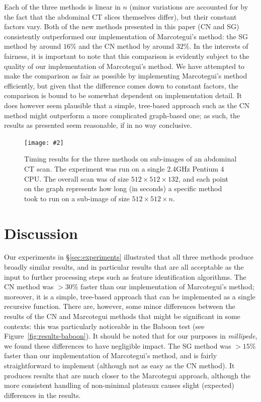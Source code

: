 \documentclass[preprint,a4paper]{elsarticle}
\newcommand{\stufigex}[5]					%
{
	\begin{figure}[#5]
	\begin{center}
		\texttt{[image: \#2]}
		\caption{#3}
		\label{#4}
	\end{center}
	\end{figure}
}
\begin{document}
Each of the three methods is linear in $n$ (minor variations are accounted for by the fact that the abdominal CT slices themselves differ), but their constant factors vary. Both of the new methods presented in this paper (CN and SG) consistently outperformed our implementation of Marcotegui's method: the SG method by around $16$\% and the CN method by around $32$\%. In the interests of fairness, it is important to note that this comparison is evidently subject to the quality of our implementation of Marcotegui's method. We have attempted to make the comparison as fair as possible by implementing Marcotegui's method efficiently, but given that the difference comes down to constant factors, the comparison is bound to be somewhat dependent on implementation detail. It does however seem plausible that a simple, tree-based approach such as the CN method might outperform a more complicated graph-based one; as such, the results as presented seem reasonable, if in no way conclusive.

\stufigex{width=.95\linewidth}{timings.png}{Timing results for the three methods on sub-images of an abdominal CT scan. The experiment was run on a single 2.4GHz Pentium 4 CPU. The overall scan was of size $512 \times 512 \times 132$, and each point on the graph represents how long (in seconds) a specific method took to run on a sub-image of size $512 \times 512 \times n$.}{fig:timings}{!t}


\section{Discussion}
\label{sec:discussion}

Our experiments in \S\ref{sec:experiments} illustrated that all three methods produce broadly similar results, and in particular results that are all acceptable as the input to further processing steps such as feature identification algorithms. The CN method was $> 30$\% faster than our implementation of Marcotegui's method; moreover, it is a simple, tree-based approach that can be implemented as a single recursive function. There are, however, some minor differences between the results of the CN and Marcotegui methods that might be significant in some contexts: this was particularly noticeable in the Baboon test (see Figure~\ref{fig:results-baboon}). It should be noted that for our purposes in \emph{millipede}, we found these differences to have negligible impact. The SG method was $> 15$\% faster than our implementation of Marcotegui's method, and is fairly straightforward to implement (although not as easy as the CN method). It produces results that are much closer to the Marcotegui approach, although the more consistent handling of non-minimal plateaux causes slight (expected) differences in the results.
\end{document}
